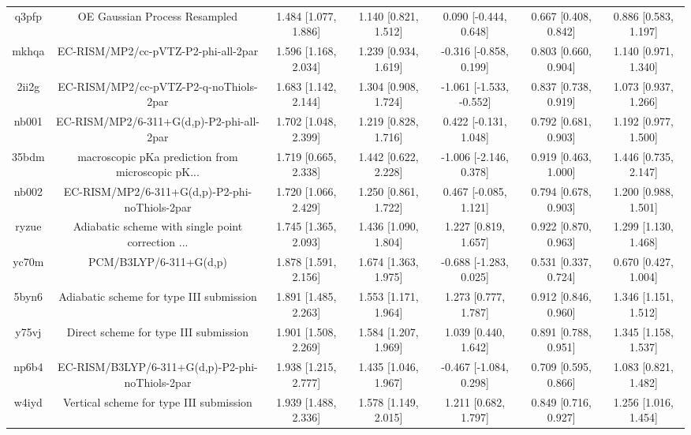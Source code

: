 \documentclass{article}
\begin{document}
\begin{center}
\begin{longtable}{|ccccccc|}
 q3pfp &                      OE Gaussian Process Resampled &  1.484 [1.077, 1.886] &  1.140 [0.821, 1.512] &    0.090 [-0.444, 0.648] &  0.667 [0.408, 0.842] &   0.886 [0.583, 1.197] \\
 mkhqa &                EC-RISM/MP2/cc-pVTZ-P2-phi-all-2par &  1.596 [1.168, 2.034] &  1.239 [0.934, 1.619] &   -0.316 [-0.858, 0.199] &  0.803 [0.660, 0.904] &   1.140 [0.971, 1.340] \\
 2ii2g &             EC-RISM/MP2/cc-pVTZ-P2-q-noThiols-2par &  1.683 [1.142, 2.144] &  1.304 [0.908, 1.724] &  -1.061 [-1.533, -0.552] &  0.837 [0.738, 0.919] &   1.073 [0.937, 1.266] \\
 nb001 &           EC-RISM/MP2/6-311+G(d,p)-P2-phi-all-2par &  1.702 [1.048, 2.399] &  1.219 [0.828, 1.716] &    0.422 [-0.131, 1.048] &  0.792 [0.681, 0.903] &   1.192 [0.977, 1.500] \\
 35bdm &  macroscopic pKa prediction from microscopic pK... &  1.719 [0.665, 2.338] &  1.442 [0.622, 2.228] &   -1.006 [-2.146, 0.378] &  0.919 [0.463, 1.000] &   1.446 [0.735, 2.147] \\
 nb002 &      EC-RISM/MP2/6-311+G(d,p)-P2-phi-noThiols-2par &  1.720 [1.066, 2.429] &  1.250 [0.861, 1.722] &    0.467 [-0.085, 1.121] &  0.794 [0.678, 0.903] &   1.200 [0.988, 1.501] \\
 ryzue &  Adiabatic scheme with single point correction ... &  1.745 [1.365, 2.093] &  1.436 [1.090, 1.804] &     1.227 [0.819, 1.657] &  0.922 [0.870, 0.963] &   1.299 [1.130, 1.468] \\
 yc70m &                             PCM/B3LYP/6-311+G(d,p) &  1.878 [1.591, 2.156] &  1.674 [1.363, 1.975] &   -0.688 [-1.283, 0.025] &  0.531 [0.337, 0.724] &   0.670 [0.427, 1.004] \\
 5byn6 &           Adiabatic scheme for type III submission &  1.891 [1.485, 2.263] &  1.553 [1.171, 1.964] &     1.273 [0.777, 1.787] &  0.912 [0.846, 0.960] &   1.346 [1.151, 1.512] \\
 y75vj &              Direct scheme for type III submission &  1.901 [1.508, 2.269] &  1.584 [1.207, 1.969] &     1.039 [0.440, 1.642] &  0.891 [0.788, 0.951] &   1.345 [1.158, 1.537] \\
 np6b4 &    EC-RISM/B3LYP/6-311+G(d,p)-P2-phi-noThiols-2par &  1.938 [1.215, 2.777] &  1.435 [1.046, 1.967] &   -0.467 [-1.084, 0.298] &  0.709 [0.595, 0.866] &   1.083 [0.821, 1.482] \\
 w4iyd &            Vertical scheme for type III submission &  1.939 [1.488, 2.336] &  1.578 [1.149, 2.015] &     1.211 [0.682, 1.797] &  0.849 [0.716, 0.927] &   1.256 [1.016, 1.454] \\

\end{longtable}
\end{center}
\end{document}
